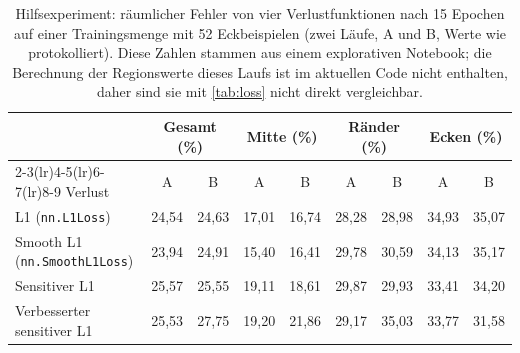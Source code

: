 \documentclass[
  11pt,
  a4paper,
  oneside,
  DIV=12,
  BCOR=8mm,
  parskip=half,
  headings=normal,
  bibliography=totoc,
  listof=totoc
]{scrreprt}
\newcommand{\code}[1]{\texttt{#1}}
\begin{document}
\begin{table}[htbp]
  \centering
  \caption{Hilfsexperiment: räumlicher Fehler von vier Verlustfunktionen nach
           15 Epochen auf einer Trainingsmenge mit 52 Eckbeispielen (zwei
           Läufe, A und B, Werte wie protokolliert). Diese Zahlen stammen aus
           einem explorativen Notebook; die Berechnung der Regionswerte dieses
           Laufs ist im aktuellen Code nicht enthalten, daher sind sie mit
           \cref{tab:loss} nicht direkt vergleichbar.}
  \label{tab:loss_aux}
  \small
  \setlength{\tabcolsep}{5pt}
  \begin{tabular}{l cc cc cc cc}
    \toprule
    & \multicolumn{2}{c}{Gesamt (\%)} & \multicolumn{2}{c}{Mitte (\%)}
    & \multicolumn{2}{c}{Ränder (\%)} & \multicolumn{2}{c}{Ecken (\%)} \\
    \cmidrule(lr){2-3}\cmidrule(lr){4-5}\cmidrule(lr){6-7}\cmidrule(lr){8-9}
    Verlust & A & B & A & B & A & B & A & B \\
    \midrule
    L1 (\code{nn.L1Loss})             & 24,54 & 24,63 & 17,01 & 16,74 & 28,28 & 28,98 & 34,93 & 35,07 \\
    Smooth L1 (\code{nn.SmoothL1Loss})& 23,94 & 24,91 & 15,40 & 16,41 & 29,78 & 30,59 & 34,13 & 35,17 \\
    Sensitiver L1                     & 25,57 & 25,55 & 19,11 & 18,61 & 29,87 & 29,93 & 33,41 & 34,20 \\
    Verbesserter sensitiver L1        & 25,53 & 27,75 & 19,20 & 21,86 & 29,17 & 35,03 & 33,77 & 31,58 \\
    \bottomrule
  \end{tabular}
\end{table}
\end{document}
